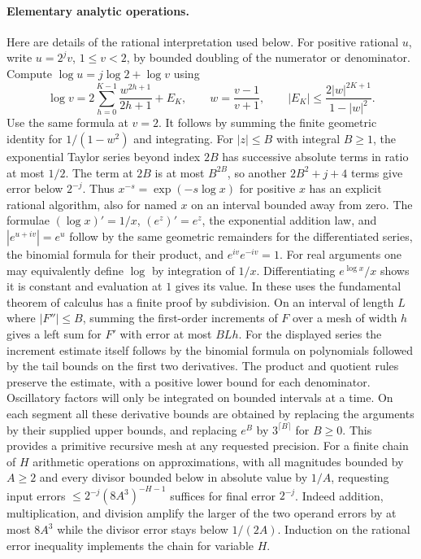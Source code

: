 \paragraph{Elementary analytic operations.}
Here are details of the rational interpretation used below. For positive
rational $u$, write $u=2^jv$, $1\le v<2$, by bounded doubling of the
numerator or denominator. Compute $\log u=j\log 2+\log v$ using
\[
   \log v=2\sum_{h=0}^{K-1}\frac{w^{2h+1}}{2h+1}+E_K,
   \qquad w=\frac{v-1}{v+1},\qquad
   |E_K|\le \frac{2|w|^{2K+1}}{1-|w|^2}.
\]
Use the same formula at $v=2$. It follows by summing the finite geometric
identity for $1/(1-w^2)$ and integrating. For $|z|\le B$ with integral
$B\ge1$, the exponential Taylor series beyond index $2B$ has successive
absolute terms in ratio at most $1/2$. The term at $2B$ is at most
$B^{2B}$, so another $2B^2+j+4$ terms give error below $2^{-j}$.
Thus $x^{-s}=\exp(-s\log x)$ for positive $x$ has an explicit
rational algorithm, also for named $x$ on an interval bounded away from
zero. The formulae $(\log x)'=1/x$, $(e^z)'=e^z$, the exponential
addition law, and $|e^{u+iv}|=e^u$ follow by the same geometric
remainders for the differentiated series, the binomial formula for their
product, and $e^{iv}e^{-iv}=1$. For real arguments one may equivalently
define $\log$ by integration of $1/x$. Differentiating
$e^{\log x}/x$ shows it is constant and evaluation at $1$ gives its
value. In these uses the fundamental theorem of calculus has a finite
proof by subdivision. On an interval of length $L$ where $|F''|\le B$, summing
the first-order increments of $F$ over a mesh of width $h$ gives
a left sum for $F'$ with error at most $BLh$.
For the displayed series the increment estimate itself follows by the
binomial formula on polynomials followed by the tail bounds on the
first two derivatives. The product and quotient rules preserve the
estimate, with a positive lower bound for each denominator. Oscillatory
factors will only be integrated on bounded intervals at a time. On
each segment all these derivative bounds are obtained by replacing
the arguments by their supplied upper bounds, and replacing $e^B$ by
$3^{\lceil B\rceil}$ for $B\ge0$. This provides a primitive recursive
mesh at any requested precision. For a finite chain of $H$ arithmetic
operations on approximations, with all magnitudes bounded by $A\ge2$
and every divisor bounded below in absolute value by $1/A$, requesting
input errors $\le 2^{-j}(8A^3)^{-H-1}$ suffices for final error
$2^{-j}$. Indeed addition, multiplication, and division amplify the
larger of the two operand errors by at most $8A^3$ while the divisor
error stays below $1/(2A)$. Induction on the rational error inequality
implements the chain for variable $H$.

